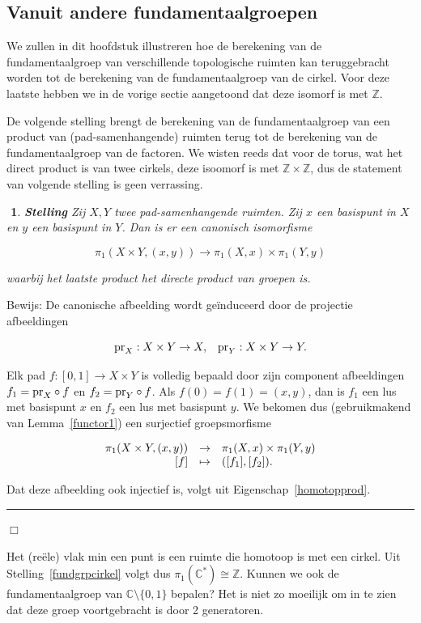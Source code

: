 \documentclass[12pt]{book}
\newcommand{\Z}{\mathbb{Z}}
\newcommand{\bew}{{\sc Bewijs: }}
\newcommand{\B}{\rule{1mm}{0mm} \hfill $\Box$ }
\newcommand{\C}{\mathbb{C}}
\newtheorem{stelh}{$\!\!$}[section]
\newenvironment{stel}{\begin{stelh}{\em {\bf Stelling }}}{\end{stelh}}
\begin{document}
\subsection{Vanuit andere fundamentaalgroepen}

We zullen in dit hoofdstuk illustreren hoe de berekening van de fundamentaalgroep van verschillende topo\-logische ruimten kan teruggebracht worden tot de berekening van de fundamentaalgroep van de cirkel. Voor deze laatste hebben we in de vorige sectie aangetoond dat deze isomorf is met $\Z$.

De volgende stelling brengt de berekening van de fundamentaalgroep van een product van
(pad-samenhangende) ruimten terug tot de berekening van de fundamentaalgroep van de factoren. We wisten reeds dat voor de torus, wat het direct product is van twee cirkels, deze isoomorf is met $\Z\times \Z$, dus de statement van volgende stelling is geen verrassing.



\begin{stel}
Zij $X,Y$ twee pad-samenhangende ruimten. Zij $x$ een basispunt in $X$ en $y$ een basispunt in $Y$.
Dan is er een canonisch isomorfisme

$$\pi_{1}(X\times Y, (x,y)) \to \pi_{1}(X,x)\times \pi_{1}(Y,y)$$

waarbij het laatste product het directe product van groepen is.
\end{stel}

\bew De canonische afbeelding wordt ge\"{i}nduceerd door de projectie afbeeldingen 

$${\rm pr}_{X}:X\times Y\to X, \;\;\; {\rm pr}_{Y}:X\times Y \to Y.$$ 

Elk pad $f:[0,1]\to X \times Y$ is volledig bepaald door
zijn component afbeeldingen $f_1= {\rm pr}_{X}\circ f$ en $f_2={\rm pr}_{Y}\circ f$. Als
$f(0)=f(1)=(x,y)$, dan is $f_1$ een lus met basispunt $x$ en $f_2$ een lus met basispunt $y$.
We bekomen dus (gebruikmakend van Lemma~\ref{functor1}) een surjectief groepsmorfisme

$$\begin{array}{rcl}
\pi_{1}(X\times Y, (x,y)) & \to & \pi_{1}(X,x)\times \pi_{1}(Y,y)\\
\rule{0mm}{0mm} [f] & \mapsto & ([f_1], [f_2]).\end{array}$$

Dat deze afbeelding ook injectief is, volgt uit Eigenschap~\ref{homotopprod}.  \B

\bigskip
Het (re\"{e}le) vlak min een punt is een ruimte die homotoop is met een cirkel. Uit Stelling~\ref{fundgrpcirkel} volgt dus $\pi_1(\C^*)\cong \Z$. Kunnen we ook de fundamentaalgroep van $\C\setminus \{0,1\}$ bepalen? Het is niet zo moeilijk om in
te zien dat deze groep voortgebracht is door 2 generatoren. 
\end{document}
